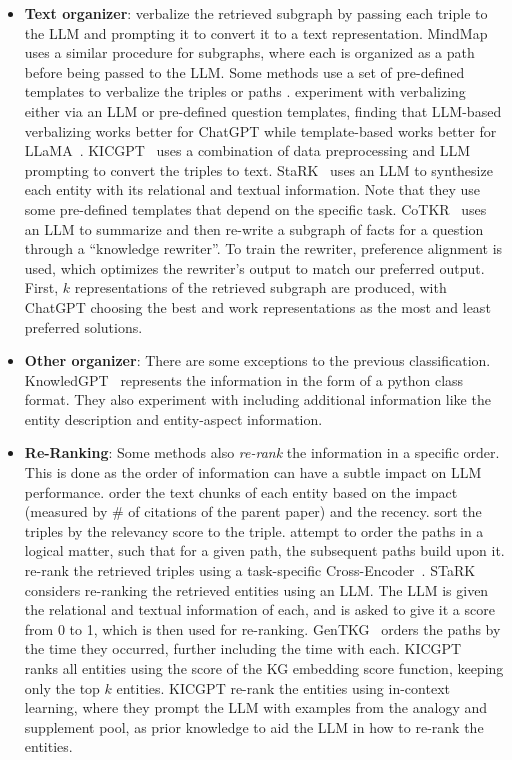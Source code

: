 \begin{itemize}[leftmargin=*]
    \item {\bf Text organizer}: \citet{retrieve_rewrite_answer} verbalize the retrieved subgraph by passing each triple to the LLM and prompting it to convert it to a text representation. MindMap~\citet{wen2023mindmap} uses a similar procedure for subgraphs, where each is organized as a path before being passed to the LLM. Some methods use a set of pre-defined templates to verbalize the triples or paths \cite{knowledgenavigator, unioqa, kim2024causal}. \citet{keqing} experiment with verbalizing either via an LLM or pre-defined question templates, finding that LLM-based verbalizing works better for ChatGPT while template-based works better for LLaMA~\cite{touvron2023llama}. KICGPT~\cite{kicgpt} uses a combination of data preprocessing and LLM prompting to convert the triples to text. StaRK~\cite{wu2024stark} uses an LLM to synthesize each entity with its relational and textual information. Note that they use some pre-defined templates that depend on the specific task. CoTKR~\cite{wu2024cotkr} uses an LLM to summarize and then re-write a subgraph of facts for a question through a ``knowledge rewriter''. To train the rewriter, preference alignment is used, which optimizes the rewriter's output to match our preferred output. First, $k$ representations of the retrieved subgraph are produced, with ChatGPT choosing the best and work representations as the most and least preferred solutions.  
    
    \item {\bf Other organizer}: There are some exceptions to the previous classification. KnowledGPT~\cite{wang2023knowledgpt} represents the information in the form of a python class format. They also experiment with including additional information like the entity description and entity-aspect information.  

    \item {\bf Re-Ranking}: Some methods also {\it re-rank} the information in a specific order. This is done as the order of information can have a subtle impact on LLM performance. \citet{delile2024graph} order the text chunks of each entity based on the impact (measured by \# of citations of the parent paper) and the recency. \citet{dai2024counter} sort the triples by the relevancy score to the triple. \citet{choudhary2023complex} attempt to order the paths in a logical matter, such that for a given path, the subsequent paths build upon it. \citet{kgrank} re-rank the retrieved triples using a task-specific Cross-Encoder~\cite{jin2023medcpt}. STaRK~\cite{wu2024stark} considers re-ranking the retrieved entities using an LLM. The LLM is given the relational and textual information of each, and is asked to give it a score from 0 to 1, which is then used for re-ranking. GenTKG~\cite{liao2024gentkg} orders the paths by the time they occurred, further including the time with each. KICGPT~\cite{kicgpt} ranks all entities using the score of the KG embedding score function, keeping only the top $k$ entities. KICGPT re-rank the entities using in-context learning, where they prompt the LLM with examples from the analogy and supplement pool, as prior knowledge to aid the LLM in how to re-rank the entities. 
    

\end{itemize}
